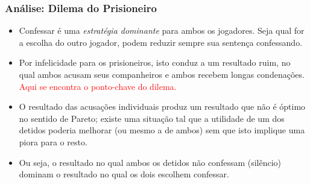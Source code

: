\begin{frame}
    \frametitle{Análise: Dilema do Prisioneiro}

   \begin{itemize}
     \item Confessar é uma \textit{estratégia dominante} para ambos os jogadores. Seja qual for a escolha do outro jogador, podem reduzir sempre sua sentença confessando. 
   
  \item Por infelicidade para os prisioneiros, isto conduz a um resultado ruim, no qual ambos acusam seus companheiros e ambos recebem longas condenações. \textcolor{red}{Aqui se encontra o ponto-chave do dilema.} 
  
  \item O resultado das acusações individuais produz um resultado que não é óptimo no sentido de Pareto; existe uma situação tal que a utilidade de um dos detidos poderia melhorar (ou mesmo a de ambos) sem que isto implique uma piora para o resto. 
  
  \item Ou seja, o resultado no qual ambos os detidos não confessam (silêncio) dominam o resultado no qual os dois escolhem confessar.

   \end{itemize}
   
\end{frame}




